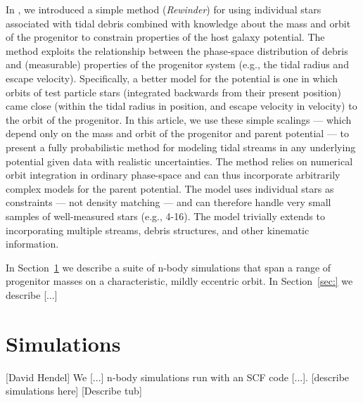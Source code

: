\documentclass[letterpaper,12pt,preprint]{aastex}
\newcommand{\paperone}{Paper 1}
\begin{document}
In \citet{apw13}, we introduced a simple method (\emph{Rewinder}) for using individual stars associated with tidal debris combined with knowledge about the mass and orbit of the progenitor to constrain properties of the host galaxy potential. The method exploits the relationship between the phase-space distribution of debris and (measurable) properties of the progenitor system (e.g., the tidal radius and escape velocity).  Specifically, a better model for the potential is one in which orbits of test particle stars (integrated backwards from their present position) came close (within the tidal radius in position, and escape velocity in velocity) to the orbit of the progenitor. In this article, we use these simple scalings --- which depend only on the mass and orbit of the progenitor and parent potential --- to present a fully probabilistic method for modeling tidal streams in any underlying potential given data with realistic uncertainties. The method relies on numerical orbit integration in ordinary phase-space and can thus incorporate arbitrarily complex models for the parent potential. The model uses individual stars as constraints --- not density matching --- and can therefore handle very small samples of well-measured stars (e.g., 4-16). The model trivially extends to incorporating multiple streams, debris structures, and other kinematic information. 

In Section~\ref{sec:sims} we describe a suite of n-body simulations that span a range of progenitor masses on a characteristic, mildly eccentric orbit. In Section~\ref{sec:} we describe [...]

\section{Simulations}\label{sec:sims}
[David Hendel]
We [...] n-body simulations run with an SCF code [...]. [describe simulations here] [Describe tub]
\end{document}
